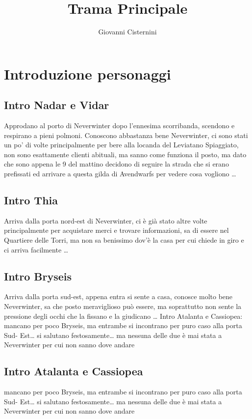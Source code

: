 \documentclass{article}
\title{Trama Principale}
\author{Giovanni Cisternini}
\begin{document}
\tableofcontents

\maketitle

\section{Introduzione personaggi}
              \subsection{Intro Nadar e Vidar}
    Approdano al porto di Neverwinter dopo l’ennesima scorribanda, scendono e respirano a pieni polmoni. Conoscono abbastanza bene Neverwinter, ci sono stati un po' di volte principalmente per bere alla locanda del Leviatano Spiaggiato, non sono esattamente clienti abituali, ma sanno come funziona il posto, ma dato che sono appena le 9 del mattino decidono di seguire la strada che si erano prefissati ed arrivare a questa gilda di Avendwarfs per vedere cosa vogliono …
              \subsection{Intro Thia}
    Arriva dalla porta nord-est di Neverwinter, ci è già stato altre volte principalmente per acquistare merci e trovare informazioni, sa di essere nel Quartiere delle Torri, ma non sa benissimo dov’è la casa per cui chiede in giro e ci arriva facilmente …
   
              \subsection{Intro Bryseis}
    Arriva dalla porta sud-est, appena entra si sente a casa, conosce molto bene Neverwinter, sa che posto meraviglioso può essere, ma soprattutto non sente la pressione degli occhi che la fissano e la giudicano …
    Intro Atalanta e Cassiopea: mancano per poco Bryseis, ma entrambe si incontrano per puro caso alla porta Sud- Est… si salutano festosamente… ma nessuna delle due è mai stata a Neverwinter per cui non sanno dove andare
              \subsection{Intro Atalanta e Cassiopea} mancano per poco Bryseis, ma entrambe si incontrano per puro caso alla porta Sud- Est… si salutano festosamente… ma nessuna delle due è mai stata a Neverwinter per cui non sanno dove andare
\end{document}
